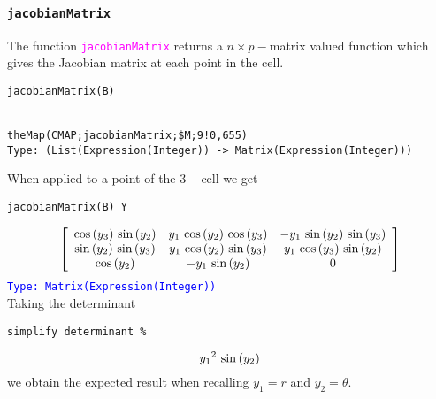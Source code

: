 \documentclass[12pt,a4paper]{article}
\newcommand{\spadfun}[1]{\textcolor{magenta}{\tt #1}}
\newcommand{\type}[1]{\textcolor{blue}{\tt\tiny #1}}
\begin{document}
\subsubsection{\tt jacobianMatrix}
The function \spadfun{jacobianMatrix} returns a $n\times p-$matrix
valued function which gives the Jacobian matrix at each point in
the cell.
\begin{lstlisting}
jacobianMatrix(B)
 

theMap(CMAP;jacobianMatrix;$M;9!0,655)
Type: (List(Expression(Integer)) -> Matrix(Expression(Integer)))

\end{lstlisting}
When applied to a point of the $3-$cell we get
\begin{verbatim}
jacobianMatrix(B) Y
\end{verbatim}
\begin{displaymath}
\left[
\begin{array}{ccc}
{{\cos 
\left(
{{y \sb {3}}} 
\right)}
\  {\sin 
\left(
{{y \sb {2}}} 
\right)}}
& {{y \sb {1}} \  {\cos 
\left(
{{y \sb {2}}} 
\right)}
\  {\cos 
\left(
{{y \sb {3}}} 
\right)}}
& -{{y \sb {1}} \  {\sin 
\left(
{{y \sb {2}}} 
\right)}
\  {\sin 
\left(
{{y \sb {3}}} 
\right)}}
\\ 
{{\sin 
\left(
{{y \sb {2}}} 
\right)}
\  {\sin 
\left(
{{y \sb {3}}} 
\right)}}
& {{y \sb {1}} \  {\cos 
\left(
{{y \sb {2}}} 
\right)}
\  {\sin 
\left(
{{y \sb {3}}} 
\right)}}
& {{y \sb {1}} \  {\cos 
\left(
{{y \sb {3}}} 
\right)}
\  {\sin 
\left(
{{y \sb {2}}} 
\right)}}
\\ 
{\cos 
\left(
{{y \sb {2}}} 
\right)}
& -{{y \sb {1}} \  {\sin 
\left(
{{y \sb {2}}} 
\right)}}
& 0 
\end{array}
\right]
\end{displaymath}
%
\type{Type: Matrix(Expression(Integer))} \\
%
Taking the determinant
\begin{verbatim}
simplify determinant %
\end{verbatim} 
\begin{displaymath}
{{{y \sb {1}}} \sp {2}} \  {\sin 
\left(
{{y \sb {2}}} 
\right)}
\end{displaymath}
we obtain the expected result when recalling $y_1=r$ and $y_2=\theta$.
%
\end{document}
